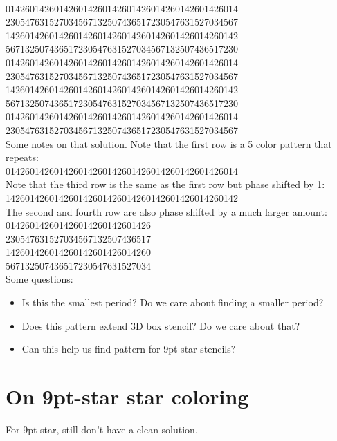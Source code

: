 \documentclass{article}
\newcommand{\highlightsol}[1]{{\color{blue}#1}}
\begin{document}
~\\
\highlightsol{014260142601426014260142601426}014260142601426014\\
\highlightsol{230547631527034567132507436517}230547631527034567\\
\highlightsol{142601426014260142601426014260}142601426014260142\\
\highlightsol{567132507436517230547631527034}567132507436517230\\
014260142601426014260142601426014260142601426014\\
230547631527034567132507436517230547631527034567\\
142601426014260142601426014260142601426014260142\\
567132507436517230547631527034567132507436517230\\
014260142601426014260142601426014260142601426014\\
230547631527034567132507436517230547631527034567\\

Some notes on that solution. Note that the first row is a 5 color pattern that repeats:\\
\highlightsol{01426}0142601426014260142601426014260142601426014\\

Note that the third row is the same as the first row but phase shifted by 1:\\
1426\highlightsol{01426}014260142601426014260142601426014260142\\

The second and fourth row are also phase shifted by a much larger amount:\\
014260142601426014260142601426\\
\highlightsol{230547631527034}567132507436517\\
142601426014260142601426014260\\
567132507436517\highlightsol{230547631527034}\\

Some questions:
\begin{itemize}
\item Is this the smallest period? Do we care about finding a smaller period?
\item Does this pattern extend 3D box stencil? Do we care about that?
\item Can this help us find pattern for 9pt-star stencils?
\end{itemize}


\section{On 9pt-star star coloring}

For 9pt star, still don't have a clean solution.
\end{document}
